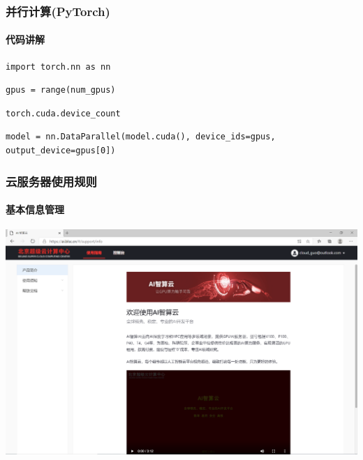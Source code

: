 \documentclass[10pt]{beamer}
\begin{document}
    \begin{frame}[fragile]
        \frametitle{并行计算(PyTorch)}
            \framesubtitle{代码讲解}
                \begin{lstlisting}[basicstyle=\small]
import torch.nn as nn
                \end{lstlisting}
                \begin{lstlisting}[basicstyle=\small]
gpus = range(num_gpus)
                \end{lstlisting}
                \begin{lstlisting}[basicstyle=\small]
torch.cuda.device_count
                \end{lstlisting}
                \begin{lstlisting}[basicstyle=\small]
model = nn.DataParallel(model.cuda(), device_ids=gpus, output_device=gpus[0]) 
                \end{lstlisting}

                



    \end{frame}

    \begin{frame}
        \frametitle{云服务器使用规则}
            \framesubtitle{基本信息管理}

            \centering
            \href{https://ai.blsc.cn/\#/support/info}{
                \includegraphics[scale=0.2]{src/img/Welcome.png}
                }

    \end{frame}
\end{document}
